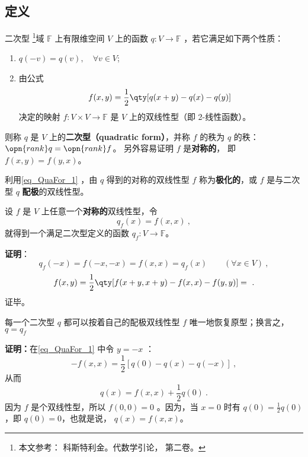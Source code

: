 
\subsection{定义}
\begin{definition}{二次型}\label{def_QuaFor_2}
\footnote{本文参考： 科斯特利金。代数学引论， 第二卷。}域 $\mathbb{F}$ 上有限维空间 $V$ 上的函数 $q:V\rightarrow\mathbb{F}$ ，若它满足如下两个性质：
\begin{enumerate}
\item $q(-{v})=q( v),\quad \forall v\in V$;
\item 由公式
\begin{equation}\label{eq_QuaFor_1}
f(x, y)=\frac{1}{2}\qty[q(x+ y)-q(x)-q(y)]~
\end{equation}
决定的映射 $f:V\times V\rightarrow\mathbb{F}$ 是 $V$ 上的双线性型（即 2-线性函数）。
\end{enumerate}
则称 $q$ 是 $V$ 上的\textbf{二次型（quadratic form）}，并称 $f$ 的秩为 $q$ 的秩：$\opn{rank} q = \opn{rank} f$。 另外容易证明 $f$ 是\textbf{对称的}， 即 $f(x,y) = f(y,x)$。
\end{definition}
利用\autoref{eq_QuaFor_1} ，由 $q$ 得到的对称的双线性型 $f$ 称为\textbf{极化的}，或 $f$ 是与二次型 $q$ \textbf{配极}的双线性型。
\begin{example}{}
设 $f$ 是 $V$ 上任意一个\textbf{对称的}双线性型，令
\begin{equation}
q_f( x)=f( x, x)~,
\end{equation}
就得到一个满足二次型定义的函数 $q_f:V\rightarrow\mathbb{F}$。

\textbf{证明}：
\begin{equation}
q_f(-{x})=f(-{x},-{x})=f({x},{x})=q_f({x}) \qquad (\forall x\in V)~,
\end{equation}
\begin{equation}
f(x, y)=\frac{1}{2}\qty[f( x+ y, x+ y)-f( x, x)-f( y, y)]
=~.
\end{equation}
证毕。
\end{example}

\begin{theorem}{}\label{the_QuaFor_1}
每一个二次型 $q$ 都可以按着自己的配极双线性型 $f$ 唯一地恢复原型；换言之， $q=q_f$
\end{theorem}
\textbf{证明：}在\autoref{eq_QuaFor_1} 中令 $y=-x$ ：
\begin{equation}
-f(x,x)=\frac{1}{2}[q(0)-q(x)-q(-x)]~,
\end{equation}
从而
\begin{equation}
q(x)=f(x,x)+\frac{1}{2}q(0)~.
\end{equation}
因为 $f$ 是个双线性型，所以 $f(0,0)=0$ 。因为，当 $x=0$ 时有 $q(0)=\frac{1}{2}q(0)$ ，即 $q(0)=0$，也就是说， $q(x)=f(x,x)$。

